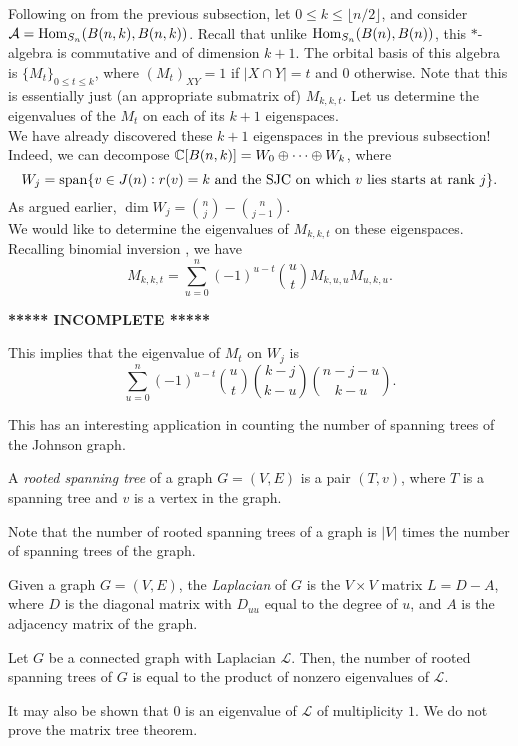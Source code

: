 	Following on from the previous subsection, let $0 \le k \le \lfloor n/2\rfloor$, and consider $\mathcal{A} = \operatorname{Hom}_{S_n}(B(n,k),B(n,k))$. Recall that unlike $\operatorname{Hom}_{S_n}(B(n),B(n))$, this $*$-algebra is commutative and of dimension $k+1$. The orbital basis of this algebra is $\{M_t\}_{0 \le t \le k}$, where $(M_t)_{XY} = 1$ if $|X \cap Y| = t$ and $0$ otherwise. Note that this is essentially just (an appropriate submatrix of) $M_{k,k,t}$. Let us determine the eigenvalues of the $M_t$ on each of its $k+1$ eigenspaces.\\
	We have already discovered these $k+1$ eigenspaces in the previous subsection! Indeed, we can decompose $\mathbb{C}[B(n,k)] = W_0 \oplus \cdots \oplus W_k$, where
	\[ W_j = \operatorname{span}\{v \in J(n) : r(v)=k \text{ and the SJC on which $v$ lies starts at rank $j$} \}. \]
	As argued earlier, $\dim W_j = \binom{n}{j} - \binom{n}{j-1}$.\\
	We would like to determine the eigenvalues of $M_{k,k,t}$ on these eigenspaces.
	Recalling binomial inversion , we have
	\[ M_{k,k,t} = \sum_{u=0}^{n} (-1)^{u-t} \binom{u}{t} M_{k,u,u} M_{u,k,u}. \]

	\textbf{***** INCOMPLETE *****}

	This implies that the eigenvalue of $M_t$ on $W_j$ is
	\[ \sum_{u=0}^n (-1)^{u-t} \binom{u}{t} \binom{k-j}{k-u} \binom{n-j-u}{k-u}. \]

	This has an interesting application in counting the number of spanning trees of the Johnson graph.

	\begin{definition}
		A \emph{rooted spanning tree} of a graph $G=(V,E)$ is a pair $(T,v)$, where $T$ is a spanning tree and $v$ is a vertex in the graph.
	\end{definition}
	Note that the number of rooted spanning trees of a graph is $|V|$ times the number of spanning trees of the graph.

	\begin{fdef}
		Given a graph $G=(V,E)$, the \emph{Laplacian} of $G$ is the $V \times V$ matrix $L = D-A$, where $D$ is the diagonal matrix with $D_{uu}$ equal to the degree of $u$, and $A$ is the adjacency matrix of the graph.
	\end{fdef}

	\begin{ftheo}
		Let $G$ be a connected graph with Laplacian $\mathcal{L}$. Then, the number of rooted spanning trees of $G$ is equal to the product of nonzero eigenvalues of $\mathcal{L}$.
	\end{ftheo}
	It may also be shown that $0$ is an eigenvalue of $\mathcal{L}$ of multiplicity $1$. We do not prove the matrix tree theorem.

